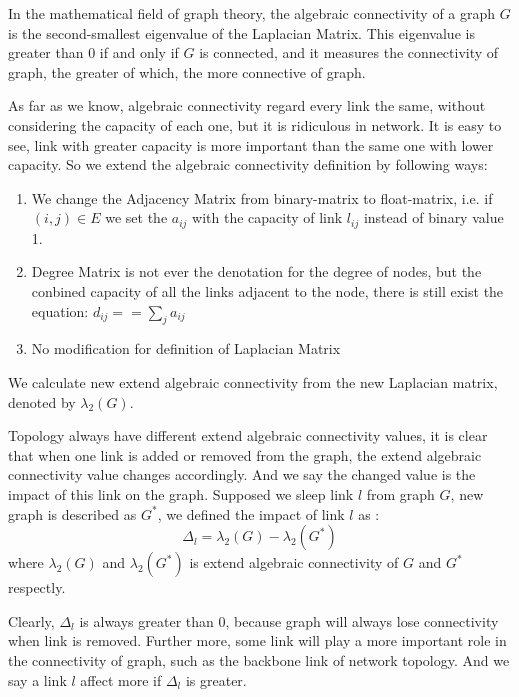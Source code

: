 \documentclass[conference]{IEEEtran}
\begin{document}
In the mathematical field of graph theory, the algebraic connectivity of a graph $G$ is the second-smallest
eigenvalue of the Laplacian Matrix. This eigenvalue is greater than 0 if and only if $G$ is connected, and 
it measures the connectivity of graph, the greater of which, the more connective of graph. 


As far as we know, 
algebraic connectivity regard every link the same, without considering the capacity of each one, but it is 
ridiculous in network. It is easy to see, link with greater capacity is more important than the same one
with lower capacity. So we extend the algebraic connectivity definition by following ways:

\begin{enumerate}
	\item We change the Adjacency Matrix from binary-matrix to float-matrix, i.e. if $(i,j) \in E$ we set the $a_{ij}$
with the capacity of link $l_{ij}$ instead of binary value 1.
	\item Degree Matrix is not ever the denotation for the degree of nodes, but the conbined capacity of all the links
adjacent to the node, there is still exist the equation: $d_{ij} == \sum_{j} a_{ij}$
	\item No modification for definition of Laplacian Matrix
\end{enumerate}


We calculate new extend algebraic connectivity from the new Laplacian matrix, denoted by $\lambda_2(G)$.


Topology always have different extend algebraic connectivity values, it is clear that when one link is added or 
removed from the graph, the extend algebraic connectivity value changes accordingly. And we say the changed value
is the impact of this link on the graph. Supposed we sleep link $l$ from graph $G$, new graph is described as $G^*$, 
we defined the impact of link $l$ as :
\begin{equation}
	\Delta_l = \lambda_2(G) - \lambda_2(G^*)
\end{equation}
where $\lambda_2(G)$ and $\lambda_2(G^*)$ is extend algebraic connectivity of $G$ and $G^*$ respectly.


Clearly, $\Delta_l$ is always greater than 0, because graph will always lose connectivity when link is removed.
Further more, some link will play a more important role in the connectivity of graph, such as the backbone link 
of network topology. And we say a link $l$ affect more if $\Delta_l$ is greater.
\end{document}
